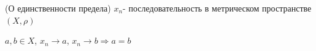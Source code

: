    
    
    
    
    
        
        
        
        
        
        
        
        
        
    \begin{theorem*} (О единственности предела)
        $x_n$- последовательность в метрическом пространстве $(X, \rho)$
        
        $a, b \in X$, $x_n \to a$, $x_n \to b \Rightarrow a = b$
    \end{theorem*}
    
